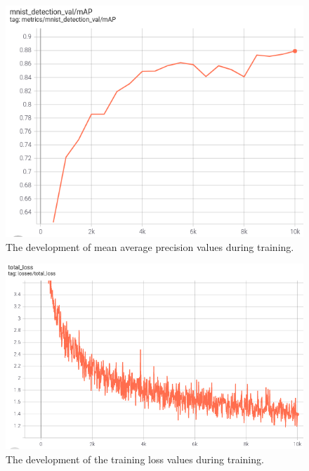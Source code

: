 \documentclass{article}
\begin{document}
\begin{figure}[H]
    \centering
    \includegraphics[width=\textwidth]{Assignments/Assignment_4/plots/map_medium.png}
    \caption{The development of mean average precision values during training. }
    \label{fig:4c_map}
\end{figure}


\begin{figure}[H]
    \centering
    \includegraphics[width=\textwidth]{Assignments/Assignment_4/plots/tot_loss_medium.png}
    \caption{The development of the training loss values during training.}
    \label{fig:4c_loss}
\end{figure}
\end{document}
